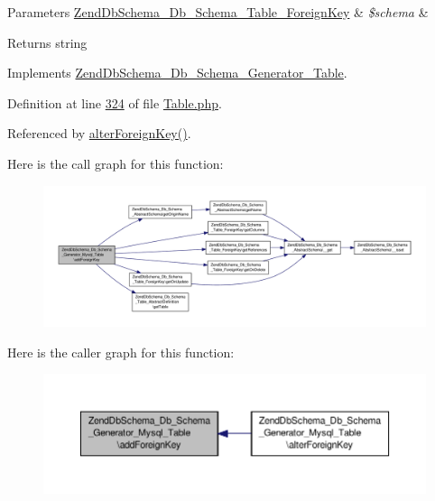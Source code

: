 \begin{DoxyParams}[1]{Parameters}
\hyperlink{classZendDbSchema__Db__Schema__Table__ForeignKey}{Zend\-Db\-Schema\-\_\-\-Db\-\_\-\-Schema\-\_\-\-Table\-\_\-\-Foreign\-Key} & {\em \$schema} & \\
\hline
\end{DoxyParams}
\begin{DoxyReturn}{Returns}
string 
\end{DoxyReturn}


Implements \hyperlink{interfaceZendDbSchema__Db__Schema__Generator__Table_aff7ec9002b094d3a62ec8bc79cf47931}{Zend\-Db\-Schema\-\_\-\-Db\-\_\-\-Schema\-\_\-\-Generator\-\_\-\-Table}.



Definition at line \hyperlink{Generator_2Mysql_2Table_8php_source_l00324}{324} of file \hyperlink{Generator_2Mysql_2Table_8php_source}{Table.\-php}.



Referenced by \hyperlink{Generator_2Mysql_2Table_8php_source_l00358}{alter\-Foreign\-Key()}.



Here is the call graph for this function\-:\nopagebreak
\begin{figure}[H]
\begin{center}
\leavevmode
\includegraphics[width=350pt]{classZendDbSchema__Db__Schema__Generator__Mysql__Table_ab0e8de60124040b8a92e5c9f3e2d63d0_cgraph}
\end{center}
\end{figure}




Here is the caller graph for this function\-:\nopagebreak
\begin{figure}[H]
\begin{center}
\leavevmode
\includegraphics[width=350pt]{classZendDbSchema__Db__Schema__Generator__Mysql__Table_ab0e8de60124040b8a92e5c9f3e2d63d0_icgraph}
\end{center}
\end{figure}



